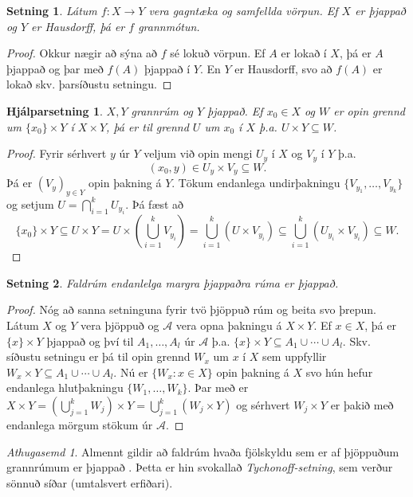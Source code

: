 \documentclass[a4paper,icelandic]{book}
\theoremstyle{definition}
\theoremstyle{plain}
\newtheorem{setn}{Setning}[section]
\newtheorem{hjalparsetn}{Hjálparsetning}[section]
\theoremstyle{remark}
\newtheorem*{ath}{Athugasemd}
\begin{document}
\begin{setn}
  Látum $f:X\to Y$ vera gagntæka og samfellda vörpun. Ef $X$ er þjappað og $Y$
  er Hausdorff, þá er $f$ grannmótun.
\end{setn}
\begin{proof}
  Okkur nægir að sýna að $f$ sé lokuð vörpun. Ef $A$ er lokað í $X$, þá er $A$
  þjappað og þar með $f(A)$ þjappað í $Y$. En $Y$ er Hausdorff, svo að $f(A)$ er
  lokað skv. þarsíðustu setningu.
\end{proof}
\begin{hjalparsetn}
  $X,Y$ grannrúm og $Y$ þjappað. Ef $x_0\in X$ og $W$ er opin grennd um
  $\{x_0\}\times Y$ í $X\times Y$, þá er til grennd $U$ um $x_0$ í $X$
  þ.a. $U\times Y\subseteq W$.
\end{hjalparsetn}
\begin{proof}
  Fyrir sérhvert $y$ úr $Y$ veljum við opin mengi $U_y$ í $X$ og $V_y$ í $Y$
  þ.a. \[
  (x_0, y)\in U_y\times V_y\subseteq W.
  \]
  Þá er $(V_y)_{y\in Y}$ opin þakning á $Y$. Tökum endanlega undirþakningu
  $\{V_{y_1},\dots,V_{y_k}\}$ og setjum $U = \bigcap_{i=1}^k U_{y_i}$. Þá fæst
  að \[
  \{x_0\}\times Y\subseteq U\times Y
  = U\times\left(\bigcup_{i=1}^k V_{y_i}\right)
  = \bigcup_{i=1}^k (U\times V_{y_i})
  \subseteq \bigcup_{i=1}^k (U_{y_i}\times V_{y_i})
  \subseteq W.
  \]
\end{proof}
\begin{setn}
  Faldrúm endanlelga margra þjappaðra rúma er þjappað.
\end{setn}
\begin{proof}
  Nóg að sanna setninguna fyrir tvö þjöppuð rúm og beita svo
  þrepun. Látum $X$ og $Y$ vera þjöppuð og $\mathcal A$ vera opna
  þakningu á $X\times Y$. Ef $x\in X$, þá er $\{x\}\times Y$ þjappað
  og því til $A_1,\dots,A_l$ úr $\mathcal A$ þ.a. $\{x\}\times
  Y\subseteq A_1\cup\cdots\cup A_l$. Skv. síðustu setningu er þá til
  opin grennd $W_x$ um $x$ í $X$ sem uppfyllir $W_x\times Y\subseteq
  A_1\cup\cdots\cup A_l$. Nú er $\{ W_x : x\in X\}$ opin þakning á $X$
  svo hún hefur endanlega hlutþakningu $\{W_1,\dots,W_k\}$. Þar með er
  $X\times Y = \left( \bigcup_{j=1}^k W_j\right)\times Y =
  \bigcup_{j=1}^k(W_j\times Y)$ og sérhvert $W_j\times Y$ er þakið með
  endanlega mörgum stökum úr $\mathcal A$.
\end{proof}
\begin{ath}
  Almennt gildir að faldrúm hvaða fjölskyldu sem er af þjöppuðum
  grannrúmum er þjappað . Þetta er hin svokallað
  \emph{Tychonoff-setning}, sem verður sönnuð síðar
  (umtalsvert erfiðari).
\end{ath}
\end{document}
